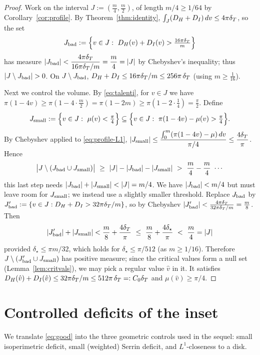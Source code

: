 \begin{proof}
Work on the interval $J:=(\tfrac m4,\tfrac m2)$, of length $m/4\ge1/64$ by
Corollary~\ref{cor:profile}. By Theorem~\ref{thm:identity},
$\int_J(D_H+D_I)\,dv\le4\pi\delta_T$, so the set
\[
   J_{\rm bad}:=\Bigl\{v\in J:\ D_H(v)+D_I(v)>\tfrac{16\pi\dT}{m}\Bigr\}
\]
has measure $|J_{\rm bad}|<\dfrac{4\pi\delta_T}{16\pi\delta_T/m}=\dfrac m4=|J|$ by
Chebyshev's inequality; thus $|J\setminus J_{\rm bad}|>0$. On
$J\setminus J_{\rm bad}$, $D_H+D_I\le 16\pi\delta_T/m\le 256\pi\,\delta_T$ (using
$m\ge\tfrac1{16}$).

Next we control the volume. By \eqref{eq:talenti}, for $v\in J$ we have
$\pi(1-4v)\ge\pi(1-4\cdot\tfrac m2)=\pi(1-2m)\ge\pi(1-2\cdot\tfrac14)=\tfrac\pi2$.
Define
\[
   J_{\rm small}:=\Bigl\{v\in J:\ \mu(v)<\tfrac\pi4\Bigr\}
   \subseteq\Bigl\{v\in J:\ \pi(1-4v)-\mu(v)>\tfrac\pi4\Bigr\}.
\]
By Chebyshev applied to \eqref{eq:profile-L1},
$|J_{\rm small}|\le\dfrac{\int_0^m(\pi(1-4v)-\mu)\,dv}{\pi/4}\le\dfrac{4\delta_T}{\pi}$.
Hence
\[
   \bigl|J\setminus(J_{\rm bad}\cup J_{\rm small})\bigr|
   \ \ge\ |J|-|J_{\rm bad}|-|J_{\rm small}|
   \ >\ \frac m4-\frac m4 \ \cdots
\]
this last step needs $|J_{\rm bad}|+|J_{\rm small}|<|J|=m/4$. We have
$|J_{\rm bad}|<m/4$ but must leave room for $J_{\rm small}$; we instead use
a slightly smaller threshold. Replace $J_{\rm bad}$ by
$J_{\rm bad}':=\{v\in J:D_H+D_I>32\pi\delta_T/m\}$, so by Chebyshev
$|J_{\rm bad}'|<\tfrac{4\pi\delta_T}{32\pi\delta_T/m}=\tfrac m8$. Then
\[
   |J_{\rm bad}'|+|J_{\rm small}|<\frac m8+\frac{4\delta_T}\pi
   \ \le\ \frac m8+\frac{4\delta_\star}\pi\ <\ \frac m4=|J|
\]
provided $\delta_\star\le \pi m/32$, which holds for
$\delta_\star\le\pi/512$ (as $m\ge1/16$). Therefore
$J\setminus(J_{\rm bad}'\cup J_{\rm small})$ has positive measure;
since the critical values form a null set
(Lemma~\ref{lem:critvals}), we may pick a regular value $\hat v$ in it.
It satisfies $D_H(\hat v)+D_I(\hat v)\le 32\pi\delta_T/m\le512\pi\,\delta_T=:C_0\delta_T$
and $\mu(\hat v)\ge\pi/4$.
\end{proof}

\section{Controlled deficits of the inset}\label{sec:controlled}

We translate \eqref{eq:good} into the three geometric controls used in the
sequel: small isoperimetric deficit, small (weighted) Serrin deficit, and
$L^1$-closeness to a disk.

